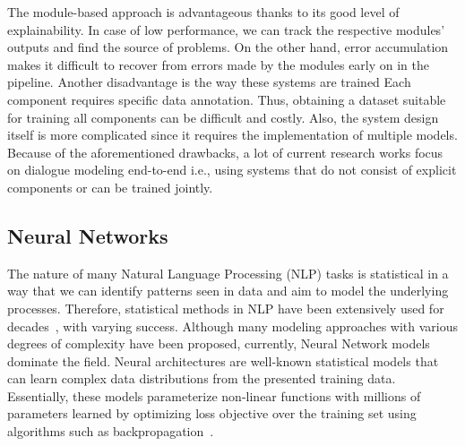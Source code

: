 The module-based approach is advantageous thanks to its good level of explainability.
In case of low performance, we can track the respective modules' outputs and find the source of problems.
On the other hand, error accumulation makes it difficult to recover from errors made by the modules early on in the pipeline.
Another disadvantage is the way these systems are trained \cite{li-etal-2017-end}
Each component requires specific data annotation.
Thus, obtaining a dataset suitable for training all components can be difficult and costly.
Also, the system design itself is more complicated since it requires the implementation of multiple models.
Because of the aforementioned drawbacks, a lot of current research works focus on dialogue modeling end-to-end i.e., using systems that do not consist of explicit components or can be trained jointly.

\subsection{Neural Networks}
\label{background:nns}
The nature of many Natural Language Processing (NLP) tasks is statistical in a way that we can identify patterns seen in data and aim to model the underlying processes.
Therefore, statistical methods in NLP have been extensively used for decades~\cite{manning99foundations}, with varying success.
Although many modeling approaches with various degrees of complexity have been proposed, currently, Neural Network models dominate the field.
Neural architectures are well-known statistical models \cite{GoodBengCour16} that can learn complex data distributions from the presented training data.
Essentially, these models parameterize non-linear functions with millions of parameters learned by optimizing loss objective over the training set using algorithms such as backpropagation~\cite{kelley1960gradient}.

